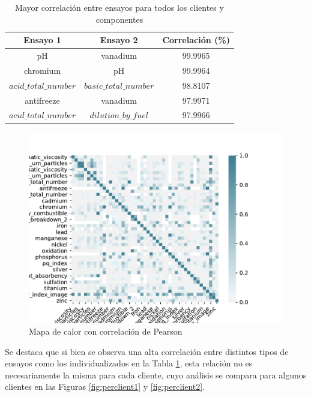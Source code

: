 \documentclass{article}
\begin{document}
\begin{table}[!htbp]
\begin{tabular}{|c|c|c|}
\hline 
Ensayo 1 & Ensayo 2 & Correlación (\%) \\ 
\hline 
pH & vanadium & 99.9965 \\ 
\hline 
chromium & pH & 99.9964 \\ 
\hline 
$acid\_total\_number$ & $basic\_total\_number$ & 98.8107 \\ 
\hline 
antifreeze & vanadium & 97.9971 \\ 
\hline 
$acid\_total\_number$ & $dilution\_by\_fuel$ & 97.9966 \\ 
\hline 
\end{tabular}
\caption{Mayor correlaci\'on entre ensayos para todos los clientes y componentes}
\label{tab:corr} 
\end{table}

\begin{figure}[!htbp]
\centering
\includegraphics[width=.85\textwidth]{figs/heatmap.pdf}
\caption{Mapa de calor con correlaci\'on de Pearson}
\label{fig:heatmap}
\end{figure}

Se destaca que si bien se observa una alta correlaci\'on entre distintos tipos de ensayos como los individualizados en la Tabla \ref{tab:corr}, esta relaci\'on no es necesariamente la misma para cada cliente, cuyo an\'alisis se compara para algunos clientes en las Figuras \ref{fig:perclient1} y \ref{fig:perclient2}.
\end{document}
